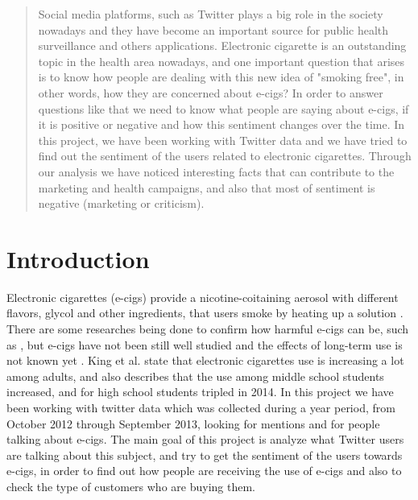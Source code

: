 \documentclass{sig-alternate}
\begin{document}
\maketitle
\begin{abstract}
Social media platforms, such as Twitter plays a big role in the society nowadays and they have become an important source for public health surveillance and others applications. Electronic cigarette is an outstanding topic in the health area nowadays, and one important question that arises is to know how people are dealing with this new idea of "smoking free", in other words, how they are concerned about e-cigs? In order to answer questions like that we need to know what people are saying about e-cigs, if it is positive or negative and how this sentiment changes over the time. In this project, we have been working with Twitter data and we have tried to find out the sentiment of the users related to electronic cigarettes. Through our analysis we have noticed interesting facts that can contribute to the marketing and health campaigns, and also that most of sentiment is negative (marketing or criticism). 
\end{abstract}



\section{Introduction}

Electronic cigarettes (e-cigs) provide a nicotine-coitaining aerosol with different flavors, glycol and other ingredients, that users smoke by heating up a solution \cite{grana2014cigarettes}. There are some researches being done to confirm how harmful e-cigs can be, such as \cite{sussan2015exposure,pauly2007tobacco}, but e-cigs have not been still well studied and the effects of long-term use is not known yet \cite{bhatnagar2014electronic}.
King et al.\cite{king2013awareness} state that electronic cigarettes use is increasing a lot among adults, and \cite{centers2013notes,ecig2015triples} also describes that the use among middle school students increased, and for high school students tripled in 2014.
In this project we have been working with twitter data which was collected during a year period, from October 2012 through September 2013, looking for mentions and for people talking about e-cigs. The main goal of this project is analyze what Twitter users are talking about this subject, and try to get the sentiment of the users towards e-cigs, in order to find out how people are receiving the use of e-cigs and also to check the type of customers who are buying them. 
\end{document}
